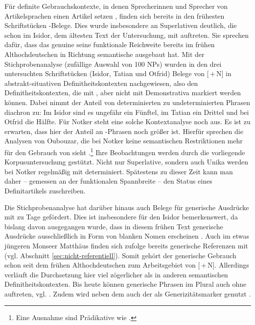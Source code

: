 Für definite Gebrauchskontexte, in denen Sprecherinnen und Sprecher von Artikelsprachen einen Artikel setzen  \parencite[832]{Himmelmann2001}, finden sich bereits in den frühesten Schriftstücken  -Belege. Dies wurde insbesondere an Superlativen deutlich, die schon im Isidor, dem ältesten Text der Untersuchung, mit  auftreten. Sie sprechen dafür, dass das genuine  seine funktionale Reichweite bereits im frühen Althochdeutschen in Richtung semantische  ausgebaut hat. Mit der Stichprobenanalyse (zufällige Auswahl von 100  NPs) wurden in den drei untersuchten Schriftstücken (Isidor, Tatian und Otfrid) Belege von [\,+\,N] in abstrakt-situativen  Definitheitskontexten  nachgewiesen, also den Definitheitskontexten, die mit , aber nicht mit Demonstrativa  markiert werden können. Dabei nimmt der Anteil von determinierten zu undeterminierten Phrasen diachron zu: Im Isidor sind es ungefähr ein Fünftel, im Tatian ein Drittel und bei Otfrid die Hälfte. Für Notker steht eine solche Kontextanalyse noch aus. Es ist zu erwarten, dass hier der Anteil an -Phrasen noch größer ist. Hierfür sprechen die Analysen von Oubouzar, die bei Notker keine semantischen Restriktionen mehr für den Gebrauch von  sieht \parencite[573]{Oubouzar1989}.\footnote{Eine Ausnahme sind Prädikative  wie .} Ihre Beobachtungen werden durch die vorliegende Korpusuntersuchung  gestützt. Nicht nur Superlative, sondern auch Unika  werden bei Notker regelmäßig mit  determiniert. Spätestens zu dieser Zeit kann man daher -- gemessen an der funktionalen Spannbreite --  den Status eines Definitartikels  zuschreiben. 

Die Stichprobenanalyse hat darüber hinaus auch Belege für generische  Ausdrücke mit  zu Tage gefördert. Dies ist insbesondere für den Isidor bemerkenswert, da bislang davon ausgegangen wurde, dass in diesem frühen Text generische  Ausdrücke ausschließlich in Form von blanken Nomen erscheinen \parencites()()[80]{Oubouzar1992}[145]{Kraiss2012}. Auch im etwas jüngeren Monseer Matthäus finden sich \textcite{Hodler1954} zufolge bereits generische  Referenzen mit  (vgl. Abschnitt \ref{sec:nicht-referentiell}). Somit gehört der generische  Gebrauch schon seit dem frühen Althochdeutschen zum Arbeitsgebiet von [\,+\,N].  Allerdings verläuft die Durchsetzung hier viel zögerlicher als in anderen semantischen  Definitheitskontexten. Bis heute können generische  Phrasen im  Plural auch ohne  auftreten, vgl.  \parencite[][145]{Barton2015}. Zudem wird neben dem  auch der  als Generizitätsmarker  genutzt \parencite{Petrova2020}.

